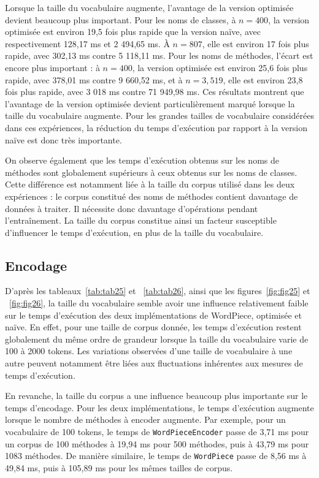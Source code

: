 \documentclass[12pt,a4paper]{report}
\begin{document}
	Lorsque la taille du vocabulaire augmente, l’avantage de la version optimisée devient beaucoup plus important. Pour les noms de classes, à $n=400$, la version optimisée est environ 19,5 fois plus rapide que la version naïve, avec respectivement 128,17 ms et 2 494,65 ms. À $n=807$, elle est environ 17 fois plus rapide, avec 302,13 ms contre 5 118,11 ms. Pour les noms de méthodes, l’écart est encore plus important : à $n=400$, la version optimisée est environ 25,6 fois plus rapide, avec 378,01 ms contre 9 660,52 ms, et à $n=3,519$, elle est environ 23,8 fois plus rapide, avec 3 018 ms contre 71 949,98 ms. Ces résultats montrent que l’avantage de la version optimisée devient particulièrement marqué lorsque la taille du vocabulaire augmente. Pour les grandes tailles de vocabulaire considérées dans ces expériences, la réduction du temps d’exécution par rapport à la version naïve est donc très importante.
	
	On observe également que les temps d’exécution obtenus sur les noms de méthodes sont globalement supérieurs à ceux obtenus sur les noms de classes. Cette différence est notamment liée à la taille du corpus utilisé dans les deux expériences : le corpus constitué des noms de méthodes contient davantage de données à traiter. Il nécessite donc davantage d’opérations pendant l’entraînement. La taille du corpus constitue ainsi un facteur susceptible d’influencer le temps d’exécution, en plus de la taille du vocabulaire.
	
	\subsection{Encodage}
	
D’après les tableaux~\ref{tab:tab25} et ~\ref{tab:tab26}, ainsi que les figures~\ref{fig:fig25} et ~\ref{fig:fig26}, la taille du vocabulaire semble avoir une influence relativement faible sur le temps d’exécution des deux implémentations de WordPiece, optimisée et naïve. En effet, pour une taille de corpus donnée, les temps d’exécution restent globalement du même ordre de grandeur lorsque la taille du vocabulaire varie de 100 à 2000 tokens. Les variations observées d’une taille de vocabulaire à une autre peuvent notamment être liées aux fluctuations inhérentes aux mesures de temps d’exécution.

En revanche, la taille du corpus a une influence beaucoup plus importante sur le temps d’encodage. Pour les deux implémentations, le temps d’exécution augmente lorsque le nombre de méthodes à encoder augmente. Par exemple, pour un vocabulaire de 100 tokens, le temps de \texttt{WordPieceEncoder} passe de 3,71 ms pour un corpus de 100 méthodes à 19,94 ms pour 500 méthodes, puis à 43,79 ms pour 1083 méthodes. De manière similaire, le temps de \texttt{WordPiece} passe de 8,56 ms à 49,84 ms, puis à 105,89 ms pour les mêmes tailles de corpus.
\end{document}
